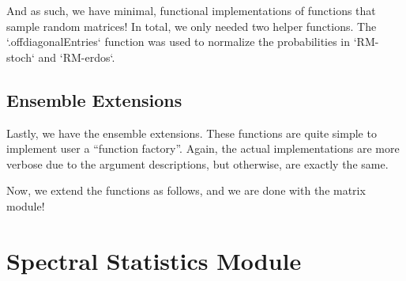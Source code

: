 
And as such, we have minimal, functional implementations of functions that sample random matrices! In total, we only needed two helper functions. The `.offdiagonalEntries` function was used to normalize the probabilities in `RM-stoch` and `RM-erdos`.

\newpage

\newpage
\subsection{Ensemble Extensions}

Lastly, we have the ensemble extensions. These functions are quite simple to implement user a ``function factory''. Again, the actual implementations are more verbose due to the argument descriptions, but otherwise, are exactly the same.


Now, we extend the functions as follows, and we are done with the matrix module!


\newpage
\section{Spectral Statistics Module}

